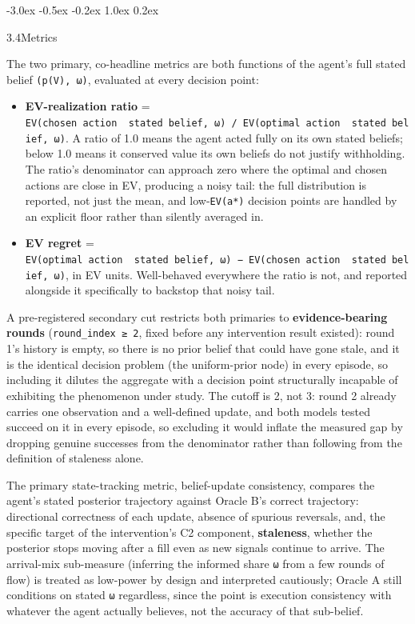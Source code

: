 \documentclass[
  11pt,
]{article}
\makeatletter
\providecommand{\tightlist}{%
  \setlength{\itemsep}{0pt}\setlength{\parskip}{0pt}}
\renewcommand{\subsection}{%
  \@startsection{subsection}{2}{\z@}%
                {-3.0ex \@plus -0.5ex \@minus -0.2ex}%
                { 1.0ex \@plus  0.2ex}%
                {\normalsize\bf\raggedright}%
}
\makeatother
\begin{document}
\subsection{3.4\quad Metrics}\label{metrics}

The two primary, co-headline metrics are both functions of the agent's full stated belief \texttt{(p(V),\ ω)}, evaluated at every decision point:

\begin{itemize}
\tightlist
\item
  \textbf{EV-realization ratio} = \texttt{EV(chosen\ action\ \textbar{}\ stated\ belief,\ ω)\ /\ EV(optimal\ action\ \textbar{}\ stated\ belief,\ ω)}. A ratio of 1.0 means the agent acted fully on its own stated beliefs; below 1.0 means it conserved value its own beliefs do not justify withholding. The ratio's denominator can approach zero where the optimal and chosen actions are close in EV, producing a noisy tail: the full distribution is reported, not just the mean, and low-\texttt{\textbar{}EV(a*)\textbar{}} decision points are handled by an explicit floor rather than silently averaged in.
\item
  \textbf{EV regret} = \texttt{EV(optimal\ action\ \textbar{}\ stated\ belief,\ ω)\ −\ EV(chosen\ action\ \textbar{}\ stated\ belief,\ ω)}, in EV units. Well-behaved everywhere the ratio is not, and reported alongside it specifically to backstop that noisy tail.
\end{itemize}

A pre-registered secondary cut restricts both primaries to \textbf{evidence-bearing rounds} (\texttt{round\_index\ ≥\ 2}, fixed before any intervention result existed): round 1's history is empty, so there is no prior belief that could have gone stale, and it is the identical decision problem (the uniform-prior node) in every episode, so including it dilutes the aggregate with a decision point structurally incapable of exhibiting the phenomenon under study. The cutoff is 2, not 3: round 2 already carries one observation and a well-defined update, and both models tested succeed on it in every episode, so excluding it would inflate the measured gap by dropping genuine successes from the denominator rather than following from the definition of staleness alone.

The primary state-tracking metric, belief-update consistency, compares the agent's stated posterior trajectory against Oracle B's correct trajectory: directional correctness of each update, absence of spurious reversals, and, the specific target of the intervention's C2 component, \textbf{staleness}, whether the posterior stops moving after a fill even as new signals continue to arrive. The arrival-mix sub-measure (inferring the informed share \texttt{ω} from a few rounds of flow) is treated as low-power by design and interpreted cautiously; Oracle A still conditions on stated \texttt{ω} regardless, since the point is execution consistency with whatever the agent actually believes, not the accuracy of that sub-belief.
\end{document}
